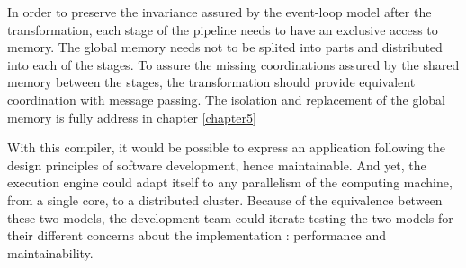 In order to preserve the invariance assured by the event-loop model after the transformation, each stage of the pipeline needs to have an exclusive access to memory.
The global memory needs not to be splited into parts and distributed into each of the stages.
To assure the missing coordinations assured by the shared memory between the stages, the transformation should provide equivalent coordination with message passing.
The isolation and replacement of the global memory is fully address in chapter \ref{chapter5}





With this compiler, it would be possible to express an application following the design principles of software development, hence maintainable.
And yet, the execution engine could adapt itself to any parallelism of the computing machine, from a single core, to a distributed cluster.
Because of the equivalence between these two models, the development team could iterate testing the two models for their different concerns about the implementation : performance and maintainability.

